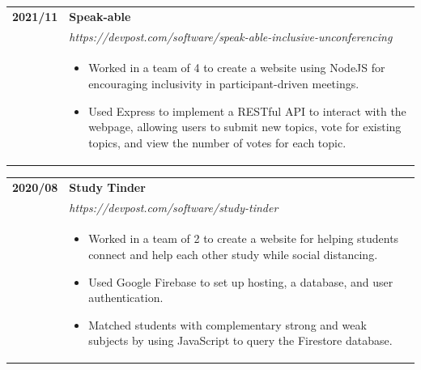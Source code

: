 \documentclass[letterpaper]{article}
\begin{document}
        \begin{tabular}{p{} p{}}
            \textbf{2021/11} & \textbf{Speak-able} \\
            & \emph{https://devpost.com/software/speak-able-inclusive-unconferencing} \\
            & \begin{itemize}
                \item Worked in a team of 4 to create a website using NodeJS for encouraging inclusivity
                    in participant-driven meetings.
                \item Used Express to implement a RESTful API to interact with the webpage, allowing
                    users to submit new topics, vote for existing topics, and view the number of votes
                    for each topic.
            \end{itemize}
            \\
        \end{tabular}

        \begin{tabular}{p{} p{}}
            \textbf{2020/08} & \textbf{Study Tinder} \\
            & \emph{https://devpost.com/software/study-tinder} \\
            & \begin{itemize}
                \item Worked in a team of 2 to create a website for helping students connect and help each
                    other study while social distancing.
                \item Used Google Firebase to set up hosting, a database, and user authentication.
                \item Matched students with complementary strong and weak subjects by using JavaScript to
                    query the Firestore database.
            \end{itemize}
            \\
        \end{tabular}
\end{document}
